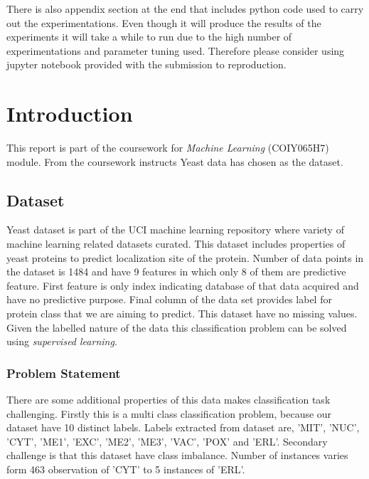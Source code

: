 \documentclass[12pt]{article}
\begin{document}
There is also appendix section at the end that includes python code used to carry out the experimentations. Even though it will produce the results of the experiments it will take a while to run due to the high number of experimentations and parameter tuning used. Therefore please consider using jupyter notebook provided with the submission to reproduction.

\clearpage

\tableofcontents
\thispagestyle{empty}
\clearpage

\setcounter{page}{1}


\section{Introduction} \label{sec:introduction}
This report is part of the coursework for \textit{Machine Learning} (COIY065H7) module. From the coursework instructs Yeast data \cite{data} has chosen as the dataset.

\subsection{Dataset} \label{subsec:data}

Yeast dataset is part of the UCI machine learning repository where variety of machine learning related datasets curated. This dataset includes properties of yeast proteins to predict localization site of the protein. Number of data points in the dataset is 1484 and have 9 features in which only 8 of them are predictive feature. First feature is only index indicating database of that data acquired and have no predictive purpose. Final column of the data set provides label for protein class that we are aiming to predict. This dataset have no missing values. Given the labelled nature of the data this classification problem can be solved using \textit{supervised learning}.

\subsubsection{Problem Statement} \label{subsec:problem}

There are some additional properties of this data makes classification task challenging. Firstly this is a multi class classification problem, because our dataset have 10 distinct labels. Labels extracted from dataset are, 'MIT', 'NUC', 'CYT', 'ME1', 'EXC', 'ME2', 'ME3', 'VAC', 'POX' and 'ERL'. Secondary challenge is that this dataset have class imbalance. Number of instances varies form 463 observation of 'CYT' to 5 instances of 'ERL'.
\end{document}
